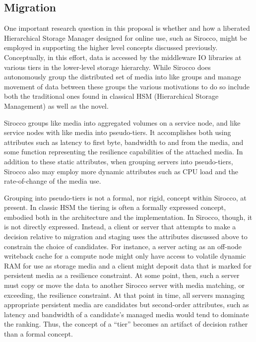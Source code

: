 \subsection{Migration}

One important research question in this proposal is whether and how a liberated
Hierarchical Storage Manager designed for online use, such as Sirocco, might be
employed in supporting the higher level concepts discussed previously.
Conceptually, in this effort, data is accessed by the middleware IO libraries
at various tiers in the lower-level storage hierarchy. While Sirocco does
autonomously group the distributed set of media into like groups and manage
movement of data between these groups the various motivations to do so include
both the traditional ones found in classical HSM (Hierarchical Storage
Management) as well as the novel.

Sirocco groups like media into aggregated volumes on a service node, and like
service nodes with like media into pseudo-tiers. It accomplishes both using
attributes such as latency to first byte, bandwidth to and from the media, and
some function representing the resilience capabilities of the attached media.
In addition to these static attributes, when grouping servers into
pseudo-tiers, Sirocco also may employ more dynamic attributes such as CPU load
and the rate-of-change of the media use.

Grouping into pseudo-tiers is not a formal, nor rigid, concept within Sirocco,
at present. In classic HSM the tiering is often a formally expressed concept,
embodied both in the architecture and the implementation. In Sirocco, though,
it is not directly expressed. Instead, a client or server that attempts to make
a decision relative to migration and staging uses the attributes discussed
above to constrain the choice of candidates. For instance, a server acting as
an off-node writeback cache for a compute node might only have access to
volatile dynamic RAM for use as storage media and a client might deposit data
that is marked for persistent media as a resilience constraint. At some point,
then, such a server must copy or move the data to another Sirocco server with
media matching, or exceeding, the resilience constraint. At that point in time,
all servers managing appropriate persistent media are candidates but
second-order attributes, such as latency and bandwidth of a candidate's managed
media would tend to dominate the ranking. Thus, the concept of a ``tier''
becomes an artifact of decision rather than a formal concept.

